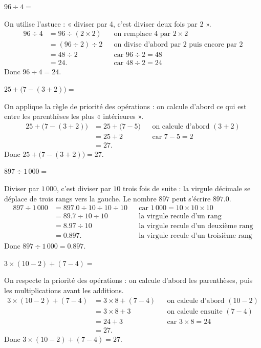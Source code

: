 \documentclass[answers]{exam}
\begin{document}
\begin{questions}
  \question $96 \div 4 =$
  \begin{solution}
  On utilise l’astuce : « diviser par 4, c’est diviser deux fois par 2 ».
  \begin{align*}
    96 \div 4
      &= 96 \div (2 \times 2) &&\text{on remplace $4$ par $2 \times 2$} \\
      &= (96 \div 2) \div 2 &&\text{on divise d’abord par 2 puis encore par 2} \\
      &= 48 \div 2 &&\text{car } 96 \div 2 = 48 \\
      &= 24. &&\text{car } 48 \div 2 = 24
  \end{align*}
  Donc $96 \div 4 = 24$.
  \end{solution}

  \question $25 + \bigl(7 - (3 + 2)\bigr) =$
  \begin{solution}
  On applique la règle de priorité des opérations : on calcule d’abord ce qui est entre les parenthèses les plus « intérieures ».
  \begin{align*}
    25 + \bigl(7 - (3 + 2)\bigr)
      &= 25 + \bigl(7 - 5\bigr) &&\text{on calcule d’abord } (3+2) \\
      &= 25 + 2 &&\text{car } 7 - 5 = 2 \\
      &= 27.
  \end{align*}
  Donc $25 + \bigl(7 - (3 + 2)\bigr) = 27$.
  \end{solution}

  \question $897 \div 1\,000 =$
  \begin{solution}
  Diviser par $1\,000$, c’est diviser par $10$ trois fois de suite : la virgule décimale se déplace de trois rangs vers la gauche. Le nombre $897$ peut s’écrire $897.0$.
  \begin{align*}
    897 \div 1\,000
      &= 897.0 \div 10 \div 10 \div 10 &&\text{car } 1\,000 = 10 \times 10 \times 10 \\
      &= 89.7 \div 10 \div 10 &&\text{la virgule recule d’un rang} \\
      &= 8.97 \div 10 &&\text{la virgule recule d’un deuxième rang} \\
      &= 0.897. &&\text{la virgule recule d’un troisième rang}
  \end{align*}
  Donc $897 \div 1\,000 = 0.897$.
  \end{solution}

  \question $3 \times (10 - 2) + (7 - 4) =$
  \begin{solution}
  On respecte la priorité des opérations : on calcule d’abord les parenthèses, puis les multiplications avant les additions.
  \begin{align*}
    3 \times (10 - 2) + (7 - 4)
      &= 3 \times 8 + (7 - 4) &&\text{on calcule d’abord } (10 - 2) \\
      &= 3 \times 8 + 3 &&\text{on calcule ensuite } (7 - 4) \\
      &= 24 + 3 &&\text{car } 3 \times 8 = 24 \\
      &= 27.
  \end{align*}
  Donc $3 \times (10 - 2) + (7 - 4) = 27$.
  \end{solution}

\end{questions}
\end{document}
